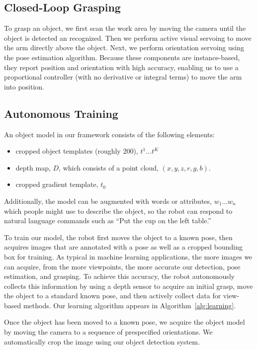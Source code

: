 \documentclass{article}
\begin{document}
\subsection{Closed-Loop Grasping}

To grasp an object, we first scan the work area by moving the camera
until the object is detected an recognized.  Then we perform active
visual servoing to move the arm directly above the object.  Next, we
perform orientation servoing using the pose estimation
algorithm. Because these components are instance-based, they report
position and orientation with high accuracy, enabling us to use a
proportional controller (with no derivative or integral terms) to move
the arm into position.





\subsection{Autonomous Training}
\label{sec:training}

An object model in our framework consists of the following elements:
\begin{itemize}
\item cropped object templates (roughly 200), $t^1 ... t^K$
\item depth map, $D$, which consists of a point cloud, $(x, y, z, r, g, b)$.
\item cropped gradient template, $t_0$
\end{itemize}

Additionally, the model can be augmented with words or attributes,
$w_1... w_n$ which people might use to describe the object, so the
robot can respond to natural language commands such as ``Put the cup
on the left table.''

To train our model, the robot first moves the object to a known pose,
then acquires images that are annotated with a pose as well as a
cropped bounding box for training.  As typical in machine learning
applications, the more images we can acquire, from the more
viewpoints, the more accurate our detection, pose estimation, and
grasping.  To achieve this accuracy, the robot autonomously collects
this information by using a depth sensor to acquire an initial grasp,
move the object to a standard known pose, and then actively collect
data for view-based methods.  Our learning algorithm appears in
Algorithm~\ref{alg:learning}.

Once the object has been moved to a known pose, we acquire the object
model by moving the camera to a sequence of prespecified orientations.
We automatically crop the image using our object detection system.
\end{document}
